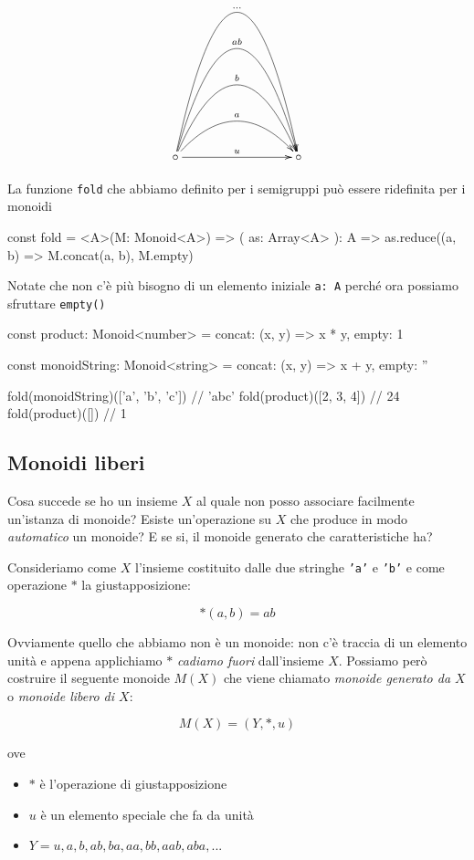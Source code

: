 \documentclass[12pt]{article}
\theoremstyle{definition}
\newenvironment{code}
  {\vspace{0.5cm} \VerbatimEnvironment\begin{typescriptcode}}
  {\end{typescriptcode} \vspace{0.2cm}}
\begin{document}
\[
\xymatrixrowsep{3cm}
\xymatrixcolsep{3cm}
\xymatrix{
  \circ \ar[r]^u \ar@/^1cm/[r]^a \ar@/^2cm/[r]^b \ar@/^3cm/[r]^{ab} \ar@/^4cm/[r]^{\ldots} & \circ
}
\]

La funzione \texttt{fold} che abbiamo definito per i semigruppi può essere ridefinita per i monoidi

\begin{code}
const fold = <A>(M: Monoid<A>) => (
  as: Array<A>
): A => as.reduce((a, b) => M.concat(a, b), M.empty)
\end{code}

Notate che non c'è più bisogno di un elemento iniziale \texttt{a: A} perché ora possiamo sfruttare \texttt{empty()}

\begin{code}
const product: Monoid<number> = {
  concat: (x, y) => x * y,
  empty: 1
}

const monoidString: Monoid<string> = {
  concat: (x, y) => x + y,
  empty: ''
}

fold(monoidString)(['a', 'b', 'c']) // 'abc'
fold(product)([2, 3, 4]) // 24
fold(product)([]) // 1
\end{code}

\subsection{Monoidi liberi}

Cosa succede se ho un insieme $X$ al quale non posso associare facilmente un'istanza di monoide?
Esiste un'operazione su $X$ che produce in modo \emph{automatico} un monoide?
E se si, il monoide generato che caratteristiche ha?

Consideriamo come $X$ l'insieme costituito dalle due stringhe \texttt{'a'} e \texttt{'b'} e come operazione $*$ la giustapposizione:

$$
*(a, b) = ab
$$

Ovviamente quello che abbiamo non è un monoide: non c'è traccia di un elemento unità e appena applichiamo $*$ \emph{cadiamo fuori}
dall'insieme $X$. Possiamo però costruire il seguente monoide $M(X)$ che viene chiamato \emph{monoide generato da $X$} o \emph{monoide libero di $X$}:

$$
M(X) = (Y, *, u)
$$

ove

\begin{itemize}
  \item $*$ è l'operazione di giustapposizione
  \item $u$ è un elemento speciale che fa da unità
  \item $Y = { u, a, b, ab, ba, aa, bb, aab, aba, ... }$
\end{itemize}
\end{document}
